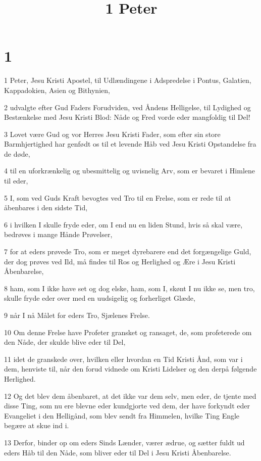

\title{1 Peter}


\chapter{1}

\par 1 Peter, Jesu Kristi Apostel, til Udlændingene i Adspredelse i Pontus, Galatien, Kappadokien, Asien og Bithynien,
\par 2 udvalgte efter Gud Faders Forudviden, ved Åndens Helligelse, til Lydighed og Bestænkelse med Jesu Kristi Blod: Nåde og Fred vorde eder mangfoldig til Del!
\par 3 Lovet være Gud og vor Herres Jesu Kristi Fader, som efter sin store Barmhjertighed har genfødt os til et levende Håb ved Jesu Kristi Opstandelse fra de døde,
\par 4 til en uforkrænkelig og ubesmittelig og uvisnelig Arv, som er bevaret i Himlene til eder,
\par 5 I, som ved Guds Kraft bevogtes ved Tro til en Frelse, som er rede til at åbenbares i den sidste Tid,
\par 6 i hvilken I skulle fryde eder, om I end nu en liden Stund, hvis så skal være, bedrøves i mange Hånde Prøvelser,
\par 7 for at eders prøvede Tro, som er meget dyrebarere end det forgængelige Guld, der dog prøves ved Ild, må findes til Ros og Herlighed og Ære i Jesu Kristi Åbenbarelse,
\par 8 ham, som I ikke have set og dog elske, ham, som I, skønt I nu ikke se, men tro, skulle fryde eder over med en uudsigelig og forherliget Glæde,
\par 9 når I nå Målet for eders Tro, Sjælenes Frelse.
\par 10 Om denne Frelse have Profeter gransket og ransaget, de, som profeterede om den Nåde, der skulde blive eder til Del,
\par 11 idet de granskede over, hvilken eller hvordan en Tid Kristi Ånd, som var i dem, henviste til, når den forud vidnede om Kristi Lidelser og den derpå følgende Herlighed.
\par 12 Og det blev dem åbenbaret, at det ikke var dem selv, men eder, de tjente med disse Ting, som nu ere blevne eder kundgjorte ved dem, der have forkyndt eder Evangeliet i den Helligånd, som blev sendt fra Himmelen, hvilke Ting Engle begære at skue ind i.
\par 13 Derfor, binder op om eders Sinds Lænder, værer ædrue, og sætter fuldt ud eders Håb til den Nåde, som bliver eder til Del i Jesu Kristi Åbenbarelse.
